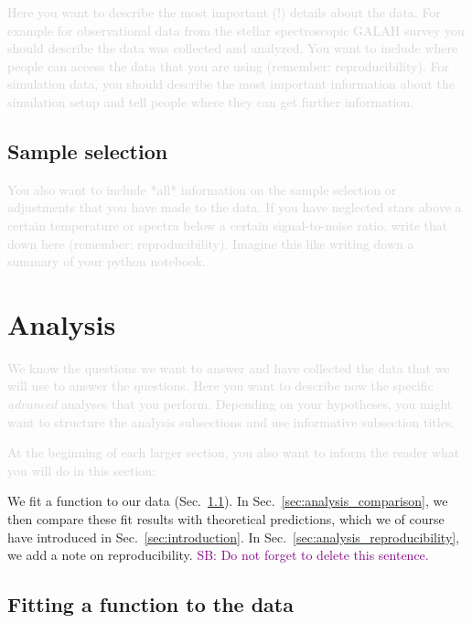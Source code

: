 \documentclass[twocolumn,apj,numberedappendix,appendixfloats]{openjournal}
\newcommand{\SB}[1]{{\textcolor{purple}{SB: #1}}}
\newcommand{\comment}[1]{\textcolor{lightgray}{#1}}
\begin{document}
\comment{Here you want to describe the most important (!) details about the data. For example for observational data from the stellar spectroscopic GALAH survey \citep{Buder2018, Buder2021, Buder2024b} you should describe the data was collected and analyzed. You want to include where people can access the data that you are using (remember: reproducibility). For simulation data, you should describe the most important information about the simulation setup and tell people where they can get further information.}

\subsection{Sample selection} \label{sec:data_selection}

\comment{You also want to include *all* information on the sample selection or adjustments that you have made to the data. If you have neglected stars above a certain temperature or spectra below a certain signal-to-noise ratio, write that down here (remember: reproducibility). Imagine this like writing down a summary of your python notebook.}

\clearpage
\section{Analysis} \label{sec:analysis}

\comment{We know the questions we want to answer and have collected the data that we will use to answer the questions. Here you want to describe now the specific \textit{advanced} analyses that you perform. Depending on your hypotheses, you might want to structure the analysis subsections and use informative subsection titles.}

\comment{At the beginning of each larger section, you also want to inform the reader what you will do in this section:}

We fit a function to our data (Sec.~\ref{sec:analysis_fitting}). In Sec.~\ref{sec:analysis_comparison}, we then compare these fit results with theoretical predictions, which we of course have introduced in Sec.~\ref{sec:introduction}. In Sec.~\ref{sec:analysis_reproducibility}, we add a note on reproducibility. \SB{Do not forget to delete this sentence.}

\subsection{Fitting a function to the data} \label{sec:analysis_fitting}
\end{document}

